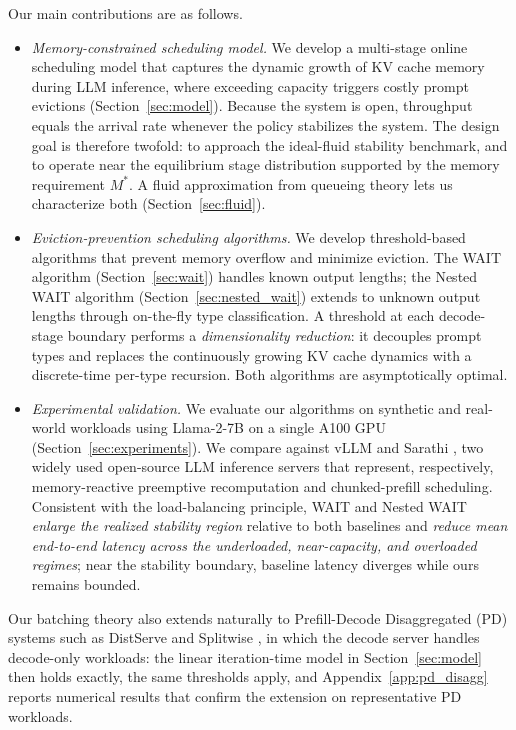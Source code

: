 Our main contributions are as follows.
\begin{itemize}
    \item \emph{Memory-constrained scheduling model.} We develop a multi-stage online scheduling model that captures the dynamic growth of KV cache memory during LLM inference, where exceeding capacity triggers costly prompt evictions (Section~\ref{sec:model}). Because the system is open, throughput equals the arrival rate whenever the policy stabilizes the system. The design goal is therefore twofold: to approach the ideal-fluid stability benchmark, and to operate near the equilibrium stage distribution supported by the memory requirement \(M^*\). A fluid approximation from queueing theory lets us characterize both (Section~\ref{sec:fluid}).
    \item \emph{Eviction-prevention scheduling algorithms.} We develop threshold-based algorithms that prevent memory overflow and minimize eviction. The WAIT algorithm (Section~\ref{sec:wait}) handles known output lengths; the Nested WAIT algorithm (Section~\ref{sec:nested_wait}) extends to unknown output lengths through on-the-fly type classification. A threshold at each decode-stage boundary performs a \emph{dimensionality reduction}: it decouples prompt types and replaces the continuously growing KV cache dynamics with a discrete-time per-type recursion. Both algorithms are asymptotically optimal.
    \item \emph{Experimental validation.} We evaluate our algorithms on synthetic and real-world workloads using Llama-2-7B on a single A100 GPU (Section~\ref{sec:experiments}). We compare against vLLM \citep{kwon2023efficient} and Sarathi \citep{agrawal2023sarathi}, two widely used open-source LLM inference servers that represent, respectively, memory-reactive preemptive recomputation and chunked-prefill scheduling. Consistent with the load-balancing principle, WAIT and Nested WAIT \emph{enlarge the realized stability region} relative to both baselines and \emph{reduce mean end-to-end latency across the underloaded, near-capacity, and overloaded regimes}; near the stability boundary, baseline latency diverges while ours remains bounded.
\end{itemize}
Our batching theory also extends naturally to Prefill-Decode Disaggregated (PD) systems such as DistServe \citep{zhong2024distserve} and Splitwise \citep{patel2024splitwise}, in which the decode server handles decode-only workloads: the linear iteration-time model in Section~\ref{sec:model} then holds exactly, the same thresholds apply, and Appendix~\ref{app:pd_disagg} reports numerical results that confirm the extension on representative PD workloads.
